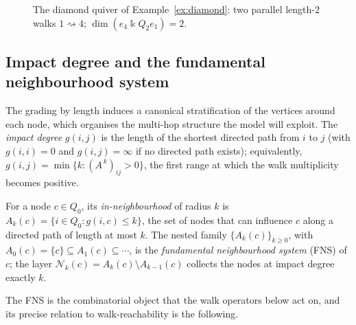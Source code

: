 \documentclass[runningheads]{llncs}
\newcommand{\kk}{\Bbbk}
\newcommand{\kQ}{\kk Q}
\newcommand{\Adj}{A}
\newcommand{\walk}{\rightsquigarrow}
\begin{document}
\begin{figure}[t]
\centering
{}
\caption{The diamond quiver of Example~\ref{ex:diamond}: two parallel
length-$2$ walks $1\walk4$; $\dim(e_4\kQ_2 e_1)=2$.}
\label{fig:diamond}
\end{figure}

\subsection{Impact degree and the fundamental neighbourhood system}
\label{sec:sfv}

The grading by length induces a canonical stratification of the vertices around
each node, which organises the multi-hop structure the model will exploit. The
\emph{impact degree} $g(i,j)$ is the length of the shortest directed path from
$i$ to $j$ (with $g(i,i)=0$ and $g(i,j)=\infty$ if no directed path exists);
equivalently, $g(i,j)=\min\{k:(\Adj^{\,k})_{ij}>0\}$, the first range at which
the walk multiplicity becomes positive.

\begin{definition}\label{def:sfv}
For a node $c\in Q_0$, its \emph{in-neighbourhood} of radius $k$ is
$A_k(c)=\{i\in Q_0: g(i,c)\le k\}$, the set of nodes that can influence $c$
along a directed path of length at most $k$. The nested family
$\{A_k(c)\}_{k\ge0}$, with $A_0(c)=\{c\}\subseteq A_1(c)\subseteq\cdots$, is
the \emph{fundamental neighbourhood system} (FNS) of $c$; the layer
$\mathcal{N}_k(c)=A_k(c)\setminus A_{k-1}(c)$ collects the nodes at impact
degree exactly $k$.
\end{definition}

The FNS is the combinatorial object that the walk operators below act on, and
its precise relation to walk-reachability is the following.
\end{document}
